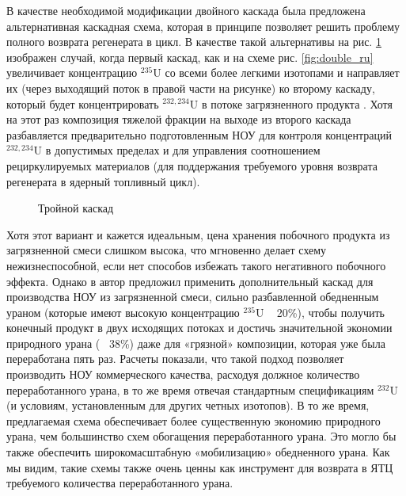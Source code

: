 В качестве необходимой модификации двойного каскада была предложена альтернативная каскадная схема, которая в принципе позволяет решить проблему полного возврата регенерата в цикл. В качестве такой альтернативы на рис. \ref{fig:triple} изображен случай, когда первый каскад, как и на схеме рис. \ref{fig:double_ru} увеличивает концентрацию $^{235}$U со всеми более легкими изотопами и направляет их (через выходящий поток в правой части на рисунке) ко второму каскаду, который будет концентрировать $^{232,234}$U в потоке загрязненного продукта \cite{smirnovObogashchenieRegenerirovannogoUrana2018}. Хотя на этот раз композиция тяжелой фракции на выходе из второго каскада разбавляется предварительно подготовленным НОУ для контроля концентраций $^{232,234}$U в допустимых пределах и для управления соотношением рециркулируемых материалов (для поддержания требуемого уровня возврата регенерата в ядерный топливный цикл).
\begin{figure}[ht]
  \caption{Тройной каскад}\label{fig:triple}
\end{figure}

Хотя этот вариант и кажется идеальным, цена хранения побочного продукта из загрязненной смеси слишком высока, что мгновенно делает схему нежизнеспособной, если нет способов избежать такого негативного побочного эффекта.
Однако в \cite{smirnovMethodEnrichReprocessed2019} автор предложил применить дополнительный каскад для производства НОУ из загрязненной смеси, сильно разбавленной обедненным ураном (которые имеют высокую концентрацию $^{235}$U ~ 20\%), чтобы получить конечный продукт в двух исходящих потоках и достичь значительной экономии природного урана (~ 38\%) даже для «грязной» композиции, которая уже была переработана пять раз. Расчеты показали, что такой подход позволяет производить НОУ коммерческого качества, расходуя должное количество переработанного урана, в то же время отвечая стандартным спецификациям $^{232}$U (и условиям, установленным для других четных изотопов). В то же время, предлагаемая схема обеспечивает более существенную экономию природного урана, чем большинство схем обогащения переработанного урана. Это могло бы также обеспечить широкомасштабную «мобилизацию» обедненного урана.
Как мы видим, такие схемы также очень ценны как инструмент для возврата в ЯТЦ требуемого количества переработанного урана.

